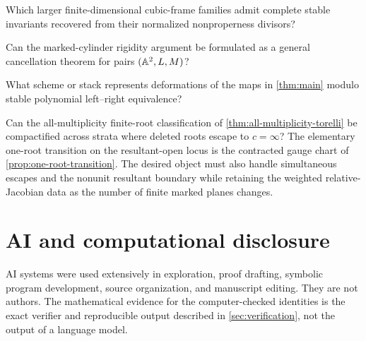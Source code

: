 \documentclass[11pt,reqno]{amsart}
\begin{document}
\begin{question}
Which larger finite-dimensional cubic-frame families admit complete stable
invariants recovered from their normalized nonproperness divisors?
\end{question}

\begin{question}
Can the marked-cylinder rigidity argument be formulated as a general
cancellation theorem for pairs \((\mathbb A^2,L,M)\)?
\end{question}

\begin{question}
What scheme or stack represents deformations of the maps in
\cref{thm:main} modulo stable polynomial left--right equivalence?
\end{question}

\begin{question}
\label{q:compactified-stable-moduli}
Can the all-multiplicity finite-root classification of
\cref{thm:all-multiplicity-torelli} be compactified across strata where
deleted roots escape to \(c=\infty\)?  The elementary one-root transition
on the resultant-open locus is the contracted gauge chart of
\cref{prop:one-root-transition}.  The desired object must also handle
simultaneous escapes and the nonunit resultant boundary while retaining the
weighted relative-Jacobian data as the number of finite marked planes
changes.
\end{question}

\appendix






\section*{AI and computational disclosure}

AI systems were used extensively in exploration, proof drafting, symbolic
program development, source organization, and manuscript editing.  They are
not authors.  The mathematical evidence for the computer-checked identities
is the exact verifier and reproducible output described in
\cref{sec:verification}, not the output of a language model.



\end{document}
